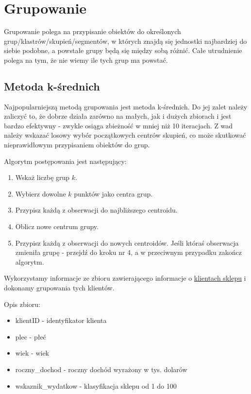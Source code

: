 \documentclass[]{book}
\providecommand{\tightlist}{%
  \setlength{\itemsep}{0pt}\setlength{\parskip}{0pt}}
\begin{document}
\chapter{Grupowanie}\label{grupowanie}

Grupowanie polega na przypisanie obiektów do określonych
grup/klastrów/skupień/segmentów, w których znajdą się jednostki
najbardziej do siebie podobne, a powstałe grupy będą się między sobą
różnić. Całe utrudnienie polega na tym, że nie wiemy ile tych grup ma
powstać.

\section{Metoda k-średnich}\label{metoda-k-srednich}

Najpopularniejszą metodą grupowania jest metoda k-średnich. Do jej zalet
należy zaliczyć to, że dobrze działa zarówno na małych, jak i dużych
zbiorach i jest bardzo efektywny - zwykle osiąga zbieżność w mniej niż
10 iteracjach. Z wad należy wskazać losowy wybór początkowych centrów
skupień, co może skutkować nieprawidłowym przypisaniem obiektów do grup.

Algorytm postępowania jest następujący:

\begin{enumerate}
\def\labelenumi{\arabic{enumi}.}
\tightlist
\item
  Wskaż liczbę grup \(k\).
\item
  Wybierz dowolne \(k\) punktów jako centra grup.
\item
  Przypisz każdą z obserwacji do najbliższego centroidu.
\item
  Oblicz nowe centrum grupy.
\item
  Przypisz każdą z obserwacji do nowych centroidów. Jeśli któraś
  obserwacja zmieniła grupę - przejdź do kroku nr 4, a w przeciwnym
  przypadku zakończ algorytm.
\end{enumerate}

Wykorzystamy informacje ze zbioru zawierającego informacje o
\href{data/klienci.csv}{klientach sklepu} i dokonamy grupowania tych
klientów.

Opis zbioru:

\begin{itemize}
\tightlist
\item
  klientID - identyfikator klienta
\item
  plec - płeć
\item
  wiek - wiek
\item
  roczny\_dochod - roczny dochód wyrażony w tys. dolarów
\item
  wskaznik\_wydatkow - klasyfikacja sklepu od 1 do 100
\end{itemize}
\end{document}
